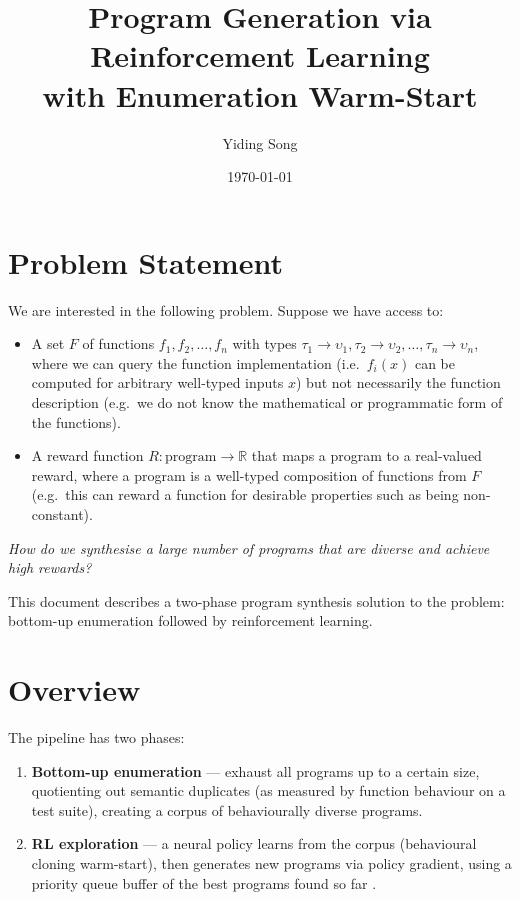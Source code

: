 \documentclass[11pt,a4paper]{article}
\title{Program Generation via Reinforcement Learning\\with Enumeration Warm-Start}
\author{Yiding Song}
\date{\today}
\begin{document}
\maketitle

\section*{Problem Statement}

We are interested in the following problem. Suppose we have access to:
\begin{itemize}
  \item A set $F$ of functions $f_1, f_2, \ldots, f_n$ with types
        $\tau_1 \to \upsilon_1, \tau_2 \to \upsilon_2, \ldots, \tau_n \to \upsilon_n$,
        where we can query the function implementation (i.e.\ $f_i(x)$ can be computed
        for arbitrary well-typed inputs $x$) but not necessarily the function description
        (e.g.\ we do not know the mathematical or programmatic form of the functions).
  \item A reward function $R: \mathrm{program} \to \mathbb{R}$ that maps a program to a
        real-valued reward, where a program is a well-typed composition of functions from
        $F$ (e.g.\ this can reward a function for desirable properties such as being
        non-constant).
\end{itemize}

{\it How do we synthesise a large number of programs that are diverse and achieve high rewards?}

This document describes a two-phase program synthesis solution to the problem: bottom-up enumeration
followed by reinforcement learning.

\section*{Overview}

The pipeline has two phases:

\begin{enumerate}
  \item \textbf{Bottom-up enumeration} --- exhaust all programs up to a certain size,
        quotienting out semantic duplicates (as measured by function behaviour on a test
        suite), creating a corpus of behaviourally diverse programs.
  \item \textbf{RL exploration} --- a neural policy learns from the corpus (behavioural
        cloning warm-start), then generates new programs via policy gradient, using a
        priority queue buffer of the best programs found so far
        \citep{abolafia2018priority}.
\end{enumerate}
\end{document}
